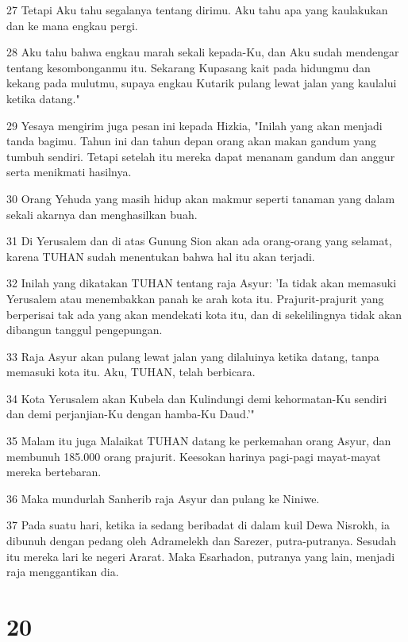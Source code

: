 \par 27 Tetapi Aku tahu segalanya tentang dirimu. Aku tahu apa yang kaulakukan dan ke mana engkau pergi.
\par 28 Aku tahu bahwa engkau marah sekali kepada-Ku, dan Aku sudah mendengar tentang kesombonganmu itu. Sekarang Kupasang kait pada hidungmu dan kekang pada mulutmu, supaya engkau Kutarik pulang lewat jalan yang kaulalui ketika datang."
\par 29 Yesaya mengirim juga pesan ini kepada Hizkia, "Inilah yang akan menjadi tanda bagimu. Tahun ini dan tahun depan orang akan makan gandum yang tumbuh sendiri. Tetapi setelah itu mereka dapat menanam gandum dan anggur serta menikmati hasilnya.
\par 30 Orang Yehuda yang masih hidup akan makmur seperti tanaman yang dalam sekali akarnya dan menghasilkan buah.
\par 31 Di Yerusalem dan di atas Gunung Sion akan ada orang-orang yang selamat, karena TUHAN sudah menentukan bahwa hal itu akan terjadi.
\par 32 Inilah yang dikatakan TUHAN tentang raja Asyur: 'Ia tidak akan memasuki Yerusalem atau menembakkan panah ke arah kota itu. Prajurit-prajurit yang berperisai tak ada yang akan mendekati kota itu, dan di sekelilingnya tidak akan dibangun tanggul pengepungan.
\par 33 Raja Asyur akan pulang lewat jalan yang dilaluinya ketika datang, tanpa memasuki kota itu. Aku, TUHAN, telah berbicara.
\par 34 Kota Yerusalem akan Kubela dan Kulindungi demi kehormatan-Ku sendiri dan demi perjanjian-Ku dengan hamba-Ku Daud.'"
\par 35 Malam itu juga Malaikat TUHAN datang ke perkemahan orang Asyur, dan membunuh 185.000 orang prajurit. Keesokan harinya pagi-pagi mayat-mayat mereka bertebaran.
\par 36 Maka mundurlah Sanherib raja Asyur dan pulang ke Niniwe.
\par 37 Pada suatu hari, ketika ia sedang beribadat di dalam kuil Dewa Nisrokh, ia dibunuh dengan pedang oleh Adramelekh dan Sarezer, putra-putranya. Sesudah itu mereka lari ke negeri Ararat. Maka Esarhadon, putranya yang lain, menjadi raja menggantikan dia.

\chapter{20}


